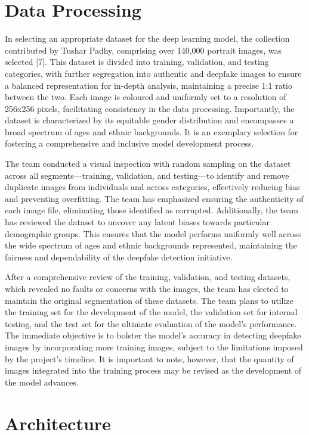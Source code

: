 \documentclass{article} %
\begin{document}
\section{Data Processing}
\label{others}

In selecting an appropriate dataset for the deep learning model, the collection contributed by Tushar Padhy, comprising over 140,000 portrait images, was selected [7]. This dataset is divided into training, validation, and testing categories, with further segregation into authentic and deepfake images to ensure a balanced representation for in-depth analysis, maintaining a precise 1:1 ratio between the two. Each image is coloured and uniformly set to a resolution of 256x256 pixels, facilitating consistency in the data processing. Importantly, the dataset is characterized by its equitable gender distribution and encompasses a broad spectrum of ages and ethnic backgrounds. It is an exemplary selection for fostering a comprehensive and inclusive model development process. 

The team conducted a visual inspection with random sampling on the dataset across all segments—training, validation, and testing—to identify and remove duplicate images from individuals and across categories, effectively reducing bias and preventing overfitting. The team has emphasized ensuring the authenticity of each image file, eliminating those identified as corrupted. Additionally,  the team has reviewed the dataset to uncover any latent biases towards particular demographic groups. This ensures that the model performs uniformly well across the wide spectrum of ages and ethnic backgrounds represented, maintaining the fairness and dependability of the deepfake detection initiative.

After a comprehensive review of the training, validation, and testing datasets, which revealed no faults or concerns with the images, the team has elected to maintain the original segmentation of these datasets. The team plans to utilize the training set for the development of the model, the validation set for internal testing, and the test set for the ultimate evaluation of the model's performance. The immediate objective is to bolster the model's accuracy in detecting deepfake images by incorporating more training images, subject to the limitations imposed by the project's timeline. It is important to note, however, that the quantity of images integrated into the training process may be revised as the development of the model advances.

\section{Architecture}
\end{document}

